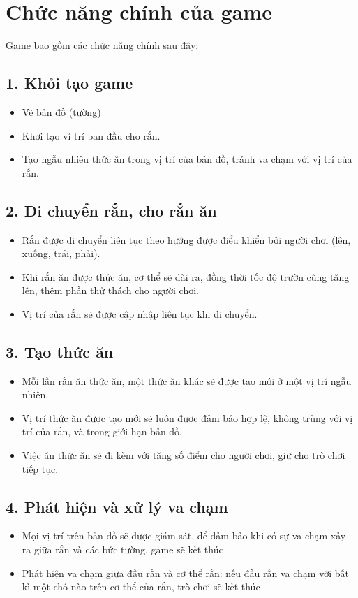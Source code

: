 \documentclass[12pt]{report}
\begin{document}
\section{Chức năng chính của game}
Game bao gồm các chức năng chính sau đây:
\subsection*{1. Khỏi tạo game}
\begin{itemize}
    \item Vẽ bản đồ (tường)
    \item Khơi tạo ví trí ban đầu cho rắn.
    \item Tạo ngẫu nhiêu thức ăn trong vị trí của bản đồ, tránh va chạm với vị trí của rắn.
\end{itemize}

\subsection*{2. Di chuyển rắn, cho rắn ăn}
\begin{itemize}
    \item Rắn được di chuyển liên tục theo hướng được điểu khiển bởi người chơi (lên, xuống, trái, phải).
    \item Khi rắn ăn được thức ăn, cơ thể sẽ dài ra, đồng thời tốc độ trườn cũng tăng lên, thêm phần thử thách cho người chơi.
    \item Vị trí của rắn sẽ được cập nhập liên tục khi di chuyển.
\end{itemize}

\subsection*{3. Tạo thức ăn}
\begin{itemize}
    \item Mỗi lần rắn ăn thức ăn, một thức ăn khác sẽ được tạo mới ở một vị trí ngẫu nhiên.
    \item Vị trí thức ăn được tạo mới sẽ luôn được đảm bảo hợp lệ, không trùng với vị trí của rắn, và trong giới hạn bản đồ.
    \item Việc ăn thức ăn sẽ đi kèm với tăng số điểm cho người chơi, giữ cho trò chơi tiếp tục.
\end{itemize}

\subsection*{4. Phát hiện và xử lý va chạm}
\begin{itemize}
    \item Mọi vị trí trên bản đồ sẽ được giám sát, để đảm bảo khi có sự va chạm xảy ra giữa rắn và các bức tường, game sẽ kết thúc
    \item Phát hiện va chạm giữa đầu rắn và cơ thể rắn: nếu đầu rắn va chạm với bất kì một chỗ nào trên cơ thể của rắn, trò chơi sẽ kết thúc
\end{itemize}
\end{document}
